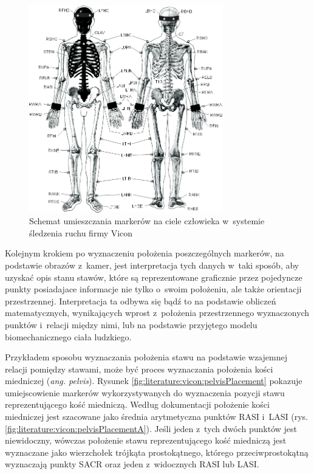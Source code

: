 \begin{savenotes}
	\begin{figure}[!htb]
		\centering	
		\includegraphics[width=0.75\textwidth]{images/markerPlacement.jpg}
		\caption[Rysunek przedstawiający schemat umieszczania markerów na ciele człowieka w~systemie śledzenia ruchu firmy Vicon]{Schemat umieszczania markerów na ciele człowieka w~systemie śledzenia ruchu firmy Vicon\cite{ViconGaitPlacement}}
		\label{fig:literature:vicon:markerPlacement}
	\end{figure}
\end{savenotes}
																			
Kolejnym krokiem po wyznaczeniu położenia poszczególnych markerów, na podstawie obrazów z~kamer, jest interpretacja tych danych w~taki sposób, aby uzyskać opis stanu stawów, które są reprezentowane graficznie przez pojedyncze punkty posiadajace informacje nie tylko o~swoim położeniu, ale także orientacji przestrzennej. Interpretacja ta odbywa się bądź to na podstawie obliczeń matematycznych, wynikających wprost z~położenia przestrzennego wyznaczonych punktów i~relacji między nimi, lub na podstawie przyjętego modelu biomechanicznego ciała ludzkiego. 

Przykładem sposobu wyznaczania położenia stawu na podstawie wzajemnej relacji pomiędzy stawami, może być proces wyznaczania położenia kości miedniczej (\emph{ang. pelvis}). Rysunek \ref{fig:literature:vicon:pelvisPlacement} pokazuje umiejscowienie markerów wykorzystywanych do wyznaczenia pozycji stawu reprezentującego kość miedniczą. Według dokumentacji \cite{ViconModelingInstruction} położenie kości miedniczej jest szacowane jako średnia arytmetyczna punktów RASI i~LASI (rys. \ref{fig:literature:vicon:pelvisPlacementA}). Jeśli jeden z~tych dwóch punktów jest niewidoczny, wówczas położenie stawu reprezentującego kość miedniczą jest wyznaczane jako wierzchołek trójkąta prostokątnego, którego przeciwprostokątną wyznaczają punkty SACR oraz jeden z~widocznych RASI lub LASI.
																	
